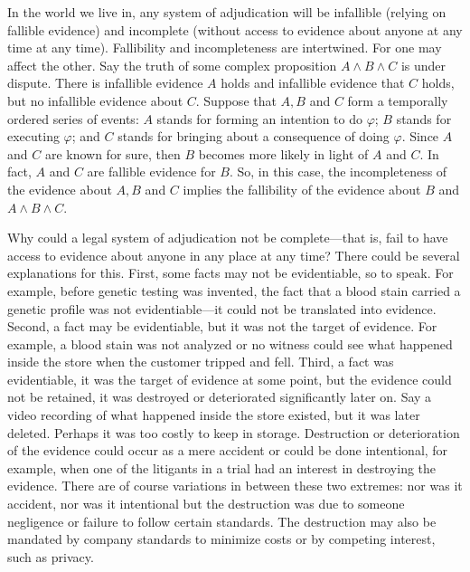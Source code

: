 \documentclass[
  10pt,
  dvipsnames,enabledeprecatedfontcommands]{scrartcl}
\begin{document}
In the world we live in, any system of adjudication will be infallible
(relying on fallible evidence) and incomplete (without access to
evidence about anyone at any time at any time). Fallibility and
incompleteness are intertwined. For one may affect the other. Say the
truth of some complex proposition \(A \wedge B \wedge C\) is under
dispute. There is infallible evidence \(A\) holds and infallible
evidence that \(C\) holds, but no infallible evidence about \(C\).
Suppose that \(A, B\) and \(C\) form a temporally ordered series of
events: \(A\) stands for forming an intention to do \(\varphi\); \(B\)
stands for executing \(\varphi\); and \(C\) stands for bringing about a
consequence of doing \(\varphi\). Since \(A\) and \(C\) are known for
sure, then \(B\) becomes more likely in light of \(A\) and \(C\). In
fact, \(A\) and \(C\) are fallible evidence for \(B\). So, in this case,
the incompleteness of the evidence about \(A, B\) and \(C\) implies the
fallibility of the evidence about \(B\) and \(A \wedge B \wedge C\).

Why could a legal system of adjudication not be complete---that is, fail
to have access to evidence about anyone in any place at any time? There
could be several explanations for this. First, some facts may not be
evidentiable, so to speak. For example, before genetic testing was
invented, the fact that a blood stain carried a genetic profile was not
evidentiable---it could not be translated into evidence. Second, a fact
may be evidentiable, but it was not the target of evidence. For example,
a blood stain was not analyzed or no witness could see what happened
inside the store when the customer tripped and fell. Third, a fact was
evidentiable, it was the target of evidence at some point, but the
evidence could not be retained, it was destroyed or deteriorated
significantly later on. Say a video recording of what happened inside
the store existed, but it was later deleted. Perhaps it was too costly
to keep in storage. Destruction or deterioration of the evidence could
occur as a mere accident or could be done intentional, for example, when
one of the litigants in a trial had an interest in destroying the
evidence. There are of course variations in between these two extremes:
nor was it accident, nor was it intentional but the destruction was due
to someone negligence or failure to follow certain standards. The
destruction may also be mandated by company standards to minimize costs
or by competing interest, such as privacy.
\end{document}
